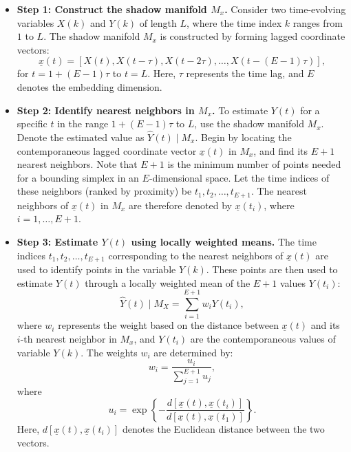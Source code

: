 \begin{itemize}
    \item \textbf{Step 1: Construct the shadow manifold \( M_x \).}  
    Consider two time-evolving variables \( X(k) \) and \( Y(k) \) of length \( L \), where the time index \( k \) ranges from \( 1 \) to \( L \). The shadow manifold \( M_x \) is constructed by forming lagged coordinate vectors:
    \[
    \underline{x}(t) = [X(t), X(t-\tau), X(t-2\tau), \dots, X(t-(E-1)\tau)],
    \]
    for \( t = 1+(E-1)\tau \) to \( t=L \). Here, \( \tau \) represents the time lag, and \( E \) denotes the embedding dimension.

    \item \textbf{Step 2: Identify nearest neighbors in \( M_x \).}  
    To estimate \( Y(t) \) for a specific \( t \) in the range \( 1+(E-1)\tau \) to \( L \), use the shadow manifold \( M_x \). Denote the estimated value as \( \hat{Y}(t) \mid M_x \). Begin by locating the contemporaneous lagged coordinate vector \( \underline{x}(t) \) in \( M_x \), and find its \( E+1 \) nearest neighbors. Note that $E+1$ is the minimum number of points needed for a bounding simplex in an $E$-dimensional space. Let the time indices of these neighbors (ranked by proximity) be \( t_1, t_2, \dots, t_{E+1} \). The nearest neighbors of \( \underline{x}(t) \) in \( M_x \) are therefore denoted by \( \underline{x}(t_i) \), where \( i = 1, \dots, E+1 \).

    \item \textbf{Step 3: Estimate \( Y(t) \) using locally weighted means.}  
    The time indices \( t_1, t_2, \dots, t_{E+1} \) corresponding to the nearest neighbors of \( \underline{x}(t) \) are used to identify points in the variable \( Y(k) \). These points are then used to estimate \( Y(t) \) through a locally weighted mean of the \( E+1 \) values \( Y(t_i) \):
    \begin{equation}
    \hat{Y}(t) \mid M_X = \sum_{i=1}^{E+1} w_i Y(t_i),
    \nonumber
    \end{equation}
    where \( w_i \) represents the weight based on the distance between \( \underline{x}(t) \) and its \( i{\text{-th}} \) nearest neighbor in \( M_x \), and \( Y(t_i) \) are the contemporaneous values of variable \( Y(k) \). The weights \( w_i \) are determined by:
    \begin{equation}
    w_i = \frac{u_i}{\sum_{j=1}^{E+1} u_j},
    \nonumber
    \end{equation}
where
    \begin{equation}
    u_i = \exp \left\{ -\frac{d[\underline{x}(t), \underline{x}(t_i)]}{d[\underline{x}(t), \underline{x}(t_1)]} \right\}.
    \nonumber
    \end{equation}
    Here, \( d[\underline{x}(t), \underline{x}(t_i)] \) denotes the Euclidean distance between the two vectors.


\end{itemize}
